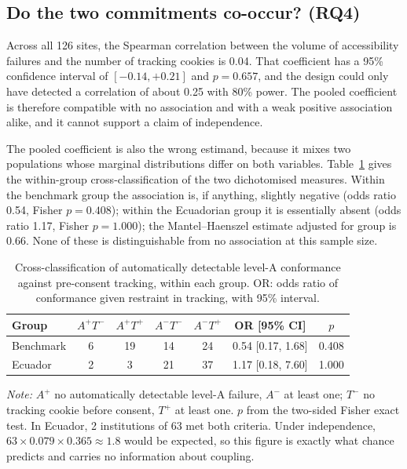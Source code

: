 \documentclass[pdflatex,sn-basic,Numbered]{sn-jnl}
\theoremstyle{thmstyleone}
\theoremstyle{thmstyletwo}
\theoremstyle{thmstylethree}
\begin{document}
\subsection{Do the two commitments co-occur? (RQ4)}\label{sec:results-joint}

Across all 126 sites, the Spearman correlation between the volume of accessibility failures and the number of tracking cookies is 0.04. That coefficient has a 95\% confidence interval of $[-0.14, +0.21]$ and $p=0.657$, and the design could only have detected a correlation of about 0.25 with 80\% power. The pooled coefficient is therefore compatible with no association and with a weak positive association alike, and it cannot support a claim of independence.

The pooled coefficient is also the wrong estimand, because it mixes two populations whose marginal distributions differ on both variables. Table~\ref{tab:joint} gives the within-group cross-classification of the two dichotomised measures. Within the benchmark group the association is, if anything, slightly negative (odds ratio 0.54, Fisher $p=0.408$); within the Ecuadorian group it is essentially absent (odds ratio 1.17, Fisher $p=1.000$); the Mantel--Haenszel estimate adjusted for group is 0.66. None of these is distinguishable from no association at this sample size.

\begin{table}[htbp]
	\centering
	\caption{Cross-classification of automatically detectable level-A conformance against pre-consent tracking, within each group. OR: odds ratio of conformance given restraint in tracking, with 95\% interval.}\label{tab:joint}
	\small
	\begin{tabular}{@{}lcccccc@{}}
		\toprule
		\textbf{Group} & $A^{+}T^{-}$ & $A^{+}T^{+}$ & $A^{-}T^{-}$ & $A^{-}T^{+}$ & \textbf{OR [95\% CI]} & \textbf{$p$} \\
		\midrule
		Benchmark & 6 & 19 & 14 & 24 & 0.54 [0.17, 1.68] & 0.408 \\
		Ecuador & 2 & 3 & 21 & 37 & 1.17 [0.18, 7.60] & 1.000 \\
		\bottomrule
	\end{tabular}
	\par\vspace{3pt}
	\footnotesize\RaggedRight\textit{Note:} $A^{+}$ no automatically detectable level-A failure, $A^{-}$ at least one; $T^{-}$ no tracking cookie before consent, $T^{+}$ at least one. $p$ from the two-sided Fisher exact test. In Ecuador, 2 institutions of 63 met both criteria. Under independence, $63 \times 0.079 \times 0.365 \approx 1.8$ would be expected, so this figure is exactly what chance predicts and carries no information about coupling.
\end{table}
\end{document}
